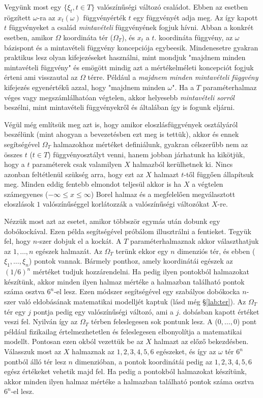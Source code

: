 \documentclass{article}
\begin{document}
Vegyünk most egy $\{\xi_t, t \in T\}$ valószínűségi változó családot. Ebben az esetben rögzített $\omega$-ra az $x_t(\omega)$ függvényérték $t$ egy függvényét adja meg. Az így kapott $t$ függvényeket a család \textit{mintavételi} függvényének fogjuk hívni. Abban a konkrét esetben, amikor $\Omega$ koordináta tér ($\Omega_T$), és $x_t$ a $t$. koordináta függvény, az $\omega$ bázispont és a mintavételi függvény koncepciója egybeesik. Mindenesetre gyakran praktikus lesz olyan kifejezéseket használni, mint mondjuk "majdnem minden mintavételi függvény" és emögött mindig azt a mértékelméleti koncepciót fogjuk érteni ami visszautal az $\Omega$ térre. Például a \textit{majdnem minden mintavételi függvény} kifejezés egyenértékű azzal, hogy "majdnem minden $\omega$". Ha a $T$ paraméterhalmaz véges vagy megszámlálhatóan végtelen, akkor helyesebb \textit{mintavételi sorról} beszélni, mint mintavételi függvényekről és általában így is fogunk eljárni.

Végül még említsük meg azt is, hogy amikor eloszlásfüggvények osztályáról beszélünk (mint ahogyan a bevezetésben ezt meg is tettük), akkor és ennek segítségével $\Omega_T$ halmazokhoz mértéket definiálunk, gyakran célszerűbb nem az összes $t$ ($t \in T$) függvényosztályt venni, hanem jobban járhatunk ha kikötjük, hogy a $t$ paraméterek csak valamilyen $X$ halmazból kerülhetnek ki. Nincs azonban feltétlenül szükség arra, hogy ezt az $X$ halmazt $t$-től függően állapítsuk meg. Minden eddig fentebb elmondot teljesül akkor is ha $X$ a végtelen számegyenes ($-\infty \leq x \leq \infty$) Borel halmaz és a megfelelően megválasztott eloszlások $1$ valószínűséggel korlátozzák a valószínűségi változókat $X$-re.

Nézzük most azt az esetet, amikor többször egymás után dobunk egy dobókockával. Ezen példa segítségével próbálom illusztrálni a fentieket. Tegyük fel, hogy $n$-szer dobjuk el a kockát. A $T$ paraméterhalmaznak akkor választhatjuk az $1,\ldots,n$ egészek halmazát. Az $\Omega_T$ terünk ekkor egy $n$ dimenziós tér, és ebben ($\xi_1,\ldots,\xi_n$) pontok vannak. Bármely ponthoz, amely koordinátái egészek az $(1/6)^n$ mértéket tudjuk hozzárendelni. Ha pedig ilyen pontokból halmazokat készítünk, akkor minden ilyen halmaz mértéke a halmazban található pontok száma osztva $6^n$-el lesz. Ezen módszer segítségével egy szabályos dobókocka $n$-szer való eldobásának matematikai modelljét kaptuk (lásd még §\ref{lab:ter}). Az $\Omega_T$ tér egy $j$ pontja pedig egy valószínűségi változó, ami a $j$. dobásban kapott értéket veszi fel. Nyilván így az $\Omega_T$ térben feleslegesen sok pontunk lesz. A ($0,\ldots,0$) pont például fizikailag értelmezhetetlen és feleslegesen elbonyolítja a matematikai modellt. Pontosan ezen okból vezettük be az $X$ halmazt az előző bekezdésben. Válasszuk most az $X$ halmaznak az $1,2,3,4,5,6$ egészeket, és így az $\omega$ tér $6^n$ pontból álló tér lesz $n$ dimenzióban, a pontok koordinátái pedig az $1,2,3,4,5,6$ egész értékeket vehetik majd fel. Ha pedig a pontokból halmazokat készítünk, akkor minden ilyen halmaz mértéke a halmazban található pontok száma osztva $6^n$-el lesz.
\end{document}
